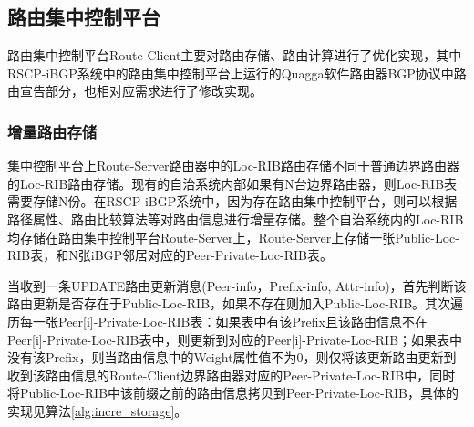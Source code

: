 \subsection{路由集中控制平台}

路由集中控制平台Route-Client主要对路由存储、路由计算进行了优化实现，其中RSCP-iBGP系统中的路由集中控制平台上运行的Quagga软件路由器BGP协议中路由宣告部分，也相对应需求进行了修改实现。

\subsubsection{增量路由存储}

集中控制平台上Route-Server路由器中的Loc-RIB路由存储不同于普通边界路由器的Loc-RIB路由存储。现有的自治系统内部如果有N台边界路由器，则Loc-RIB表需要存储N份。在RSCP-iBGP系统中，因为存在路由集中控制平台，则可以根据路径属性、路由比较算法等对路由信息进行增量存储。整个自治系统内的Loc-RIB均存储在路由集中控制平台Route-Server上，Route-Server上存储一张Public-Loc-RIB表，和N张iBGP邻居对应的Peer-Private-Loc-RIB表。

当收到一条UPDATE路由更新消息(Peer-info，Prefix-info, Attr-info)，首先判断该路由更新是否存在于Public-Loc-RIB，如果不存在则加入Public-Loc-RIB。其次遍历每一张Peer[i]-Private-Loc-RIB表：如果表中有该Prefix且该路由信息不在Peer[i]-Private-Loc-RIB表中，则更新到对应的Peer[i]-Private-Loc-RIB；如果表中没有该Prefix，则当路由信息中的Weight属性值不为0，则仅将该更新路由更新到收到该路由信息的Route-Client边界路由器对应的Peer-Private-Loc-RIB中，同时将Public-Loc-RIB中该前缀之前的路由信息拷贝到Peer-Private-Loc-RIB，具体的实现见算法\ref{alg:incre_storage}。

